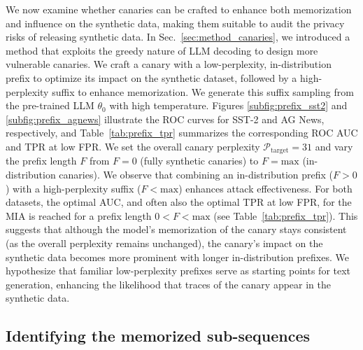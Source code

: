 We now examine whether canaries can be crafted to enhance both memorization and influence on the synthetic data, making them suitable to audit the privacy risks of releasing synthetic data.
In Sec.~\ref{sec:method_canaries}, we introduced a method that exploits the greedy nature of LLM decoding to design more vulnerable canaries.
We craft a canary with a low-perplexity, in-distribution prefix to optimize its impact on the synthetic dataset, followed by a high-perplexity suffix to enhance memorization. We generate this suffix sampling from the pre-trained LLM $\theta_0$ with high temperature.
%
Figures \ref{subfig:prefix_sst2} and \ref{subfig:prefix_agnews} illustrate the ROC curves for SST-2 and AG News, respectively, and Table~\ref{tab:prefix_tpr} summarizes the corresponding ROC AUC and TPR at low FPR.
We set the overall canary perplexity $\mathcal{P}_\textrm{target}=31$ and vary the prefix length $F$ from $F=0$ (fully synthetic canaries) to $F=\text{max}$ (in-distribution canaries). 
We observe that combining an in-distribution prefix ($F>0$) with a high-perplexity suffix ($F<\text{max}$) enhances attack effectiveness.
For both datasets, the optimal AUC, and often also the optimal TPR at low FPR, for the MIA is reached for a prefix length $0<F<\text{max}$ (see Table~\ref{tab:prefix_tpr}). 
This suggests that although the model's memorization of the canary stays consistent (as the overall perplexity remains unchanged), the canary's impact on the synthetic data becomes more prominent with longer in-distribution prefixes.
We hypothesize that familiar low-perplexity prefixes serve as starting points for text generation, enhancing the likelihood that traces of the canary appear in the synthetic data.

\subsection{Identifying the memorized sub-sequences}

